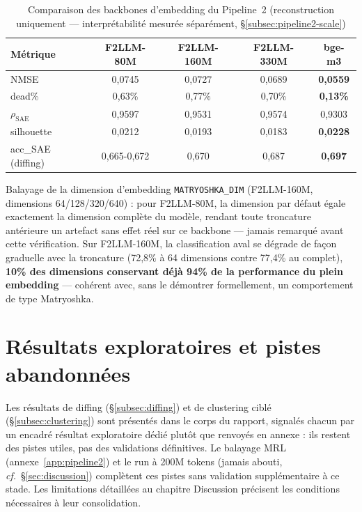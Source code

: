 \documentclass[11pt]{article}
\begin{document}
\begin{table}[!ht]
\centering
\caption{Comparaison des backbones d'embedding du Pipeline~2 (reconstruction
uniquement --- interprétabilité mesurée séparément, \S\ref{subsec:pipeline2-scale})}
\small
\begin{tabular}{@{}lcccc@{}}
\toprule
Métrique & F2LLM-80M & F2LLM-160M & F2LLM-330M & bge-m3 \\ \midrule
NMSE & 0,0745 & 0,0727 & 0,0689 & \textbf{0,0559} \\
dead\% & 0,63\% & 0,77\% & 0,70\% & \textbf{0,13\%} \\
$\rho_\text{SAE}$ & 0,9597 & 0,9531 & 0,9574 & 0,9303 \\
silhouette & 0,0212 & 0,0193 & 0,0183 & \textbf{0,0228} \\
acc\_SAE (diffing) & 0,665-0,672 & 0,670 & 0,687 & \textbf{0,697} \\
\bottomrule
\end{tabular}
\end{table}

Balayage de la dimension d'embedding \texttt{MATRYOSHKA\_DIM} (F2LLM-160M,
dimensions 64/128/320/640) : pour F2LLM-80M, la dimension par défaut égale
exactement la dimension complète du modèle, rendant toute troncature
antérieure un artefact sans effet réel sur ce backbone --- jamais remarqué
avant cette vérification. Sur F2LLM-160M, la classification aval se dégrade
de façon graduelle avec la troncature (72,8\% à 64 dimensions contre 77,4\%
au complet), \textbf{10\% des dimensions conservant déjà 94\% de la
performance du plein embedding} --- cohérent avec, sans le démontrer
formellement, un comportement de type Matryoshka.

\section{Résultats exploratoires et pistes abandonnées}

Les résultats de diffing (\S\ref{subsec:diffing}) et de clustering ciblé
(\S\ref{subsec:clustering}) sont présentés dans le corps du rapport,
signalés chacun par un encadré \og{}résultat exploratoire\fg{} dédié plutôt
que renvoyés en annexe : ils restent des pistes utiles, pas des validations
définitives. Le balayage MRL (annexe~\ref{app:pipeline2}) et le run à 200M
tokens (jamais abouti, \emph{cf.}~\S\ref{sec:discussion}) complètent ces
pistes sans validation supplémentaire à ce stade. Les limitations détaillées
au chapitre Discussion précisent les conditions nécessaires à leur
consolidation.
\end{document}
